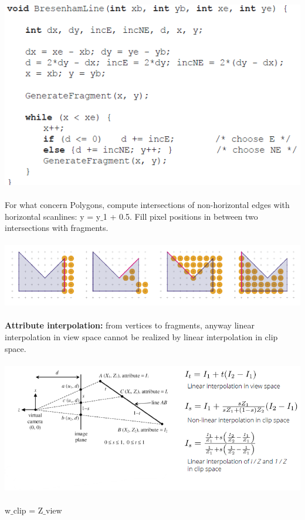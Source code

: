 \documentclass{article}
\begin{document}
\includegraphics[scale=0.6]{image56.png}\\\\
For what concern Polygons, compute intersections of non-horizontal edges with horizontal scanlines: y = y$\_$1 + 0.5. Fill pixel positions in between two intersections with fragments.\\\\
\includegraphics[scale=0.6]{image57.png}\\\\
\textbf{Attribute interpolation:} from vertices to fragments, anyway linear interpolation in view space cannot be realized by linear interpolation in clip space.\\\\
\includegraphics[scale=0.6]{image58.png}\\\\
w$\_$clip = Z$\_$view\\
\end{document}

